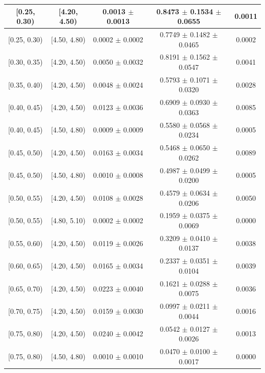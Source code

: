 \begin{longtable}{|c|c|c|c|c|}
\hline
\endlastfoot
[0.25, 0.30) & [4.20, 4.50) & 0.0013 $\pm$ 0.0013 & 0.8473 $\pm$ 0.1534 $\pm$ 0.0655 & 0.0011 \\ 
\hline
[0.25, 0.30) & [4.50, 4.80) & 0.0002 $\pm$ 0.0002 & 0.7749 $\pm$ 0.1482 $\pm$ 0.0465 & 0.0002 \\ 
\hline
[0.30, 0.35) & [4.20, 4.50) & 0.0050 $\pm$ 0.0032 & 0.8191 $\pm$ 0.1562 $\pm$ 0.0547 & 0.0041 \\ 
\hline
[0.35, 0.40) & [4.20, 4.50) & 0.0048 $\pm$ 0.0024 & 0.5793 $\pm$ 0.1071 $\pm$ 0.0320 & 0.0028 \\ 
\hline
[0.40, 0.45) & [4.20, 4.50) & 0.0123 $\pm$ 0.0036 & 0.6909 $\pm$ 0.0930 $\pm$ 0.0363 & 0.0085 \\ 
\hline
[0.40, 0.45) & [4.50, 4.80) & 0.0009 $\pm$ 0.0009 & 0.5580 $\pm$ 0.0568 $\pm$ 0.0234 & 0.0005 \\ 
\hline
[0.45, 0.50) & [4.20, 4.50) & 0.0163 $\pm$ 0.0034 & 0.5468 $\pm$ 0.0650 $\pm$ 0.0262 & 0.0089 \\ 
\hline
[0.45, 0.50) & [4.50, 4.80) & 0.0010 $\pm$ 0.0008 & 0.4987 $\pm$ 0.0499 $\pm$ 0.0200 & 0.0005 \\ 
\hline
[0.50, 0.55) & [4.20, 4.50) & 0.0108 $\pm$ 0.0028 & 0.4579 $\pm$ 0.0634 $\pm$ 0.0206 & 0.0050 \\ 
\hline
[0.50, 0.55) & [4.80, 5.10) & 0.0002 $\pm$ 0.0002 & 0.1959 $\pm$ 0.0375 $\pm$ 0.0069 & 0.0000 \\ 
\hline
[0.55, 0.60) & [4.20, 4.50) & 0.0119 $\pm$ 0.0026 & 0.3209 $\pm$ 0.0410 $\pm$ 0.0137 & 0.0038 \\ 
\hline
[0.60, 0.65) & [4.20, 4.50) & 0.0165 $\pm$ 0.0034 & 0.2337 $\pm$ 0.0351 $\pm$ 0.0104 & 0.0039 \\ 
\hline
[0.65, 0.70) & [4.20, 4.50) & 0.0223 $\pm$ 0.0040 & 0.1621 $\pm$ 0.0288 $\pm$ 0.0075 & 0.0036 \\ 
\hline
[0.70, 0.75) & [4.20, 4.50) & 0.0159 $\pm$ 0.0030 & 0.0997 $\pm$ 0.0211 $\pm$ 0.0044 & 0.0016 \\ 
\hline
[0.75, 0.80) & [4.20, 4.50) & 0.0240 $\pm$ 0.0042 & 0.0542 $\pm$ 0.0127 $\pm$ 0.0026 & 0.0013 \\ 
\hline
[0.75, 0.80) & [4.50, 4.80) & 0.0010 $\pm$ 0.0010 & 0.0470 $\pm$ 0.0100 $\pm$ 0.0017 & 0.0000 \\ 
\hline
\end{longtable}
